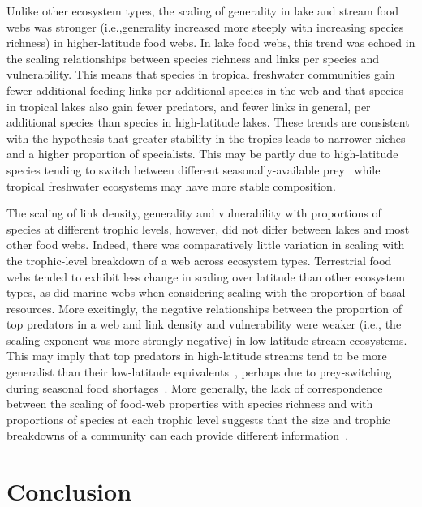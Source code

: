 \documentclass[12pt]{article}
\begin{document}
  Unlike other ecosystem types, the scaling of generality in lake and stream
  food webs was stronger (i.e.,generality increased more steeply with
  increasing species richness) in higher-latitude food webs. In lake food webs,
  this trend was echoed in the scaling relationships between species richness
  and links per species and vulnerability. This means that species in tropical
  freshwater communities gain fewer additional feeding links per additional
  species in the web and that species in tropical lakes also gain fewer
  predators, and fewer links in general, per additional species than species
  in high-latitude lakes. These trends are consistent with the hypothesis that
  greater stability in the tropics leads to narrower
  niches~\citep{Vazquez2004} and a higher proportion of specialists. This may
  be partly due to high-latitude species tending to switch between different
  seasonally-available prey~\citep{Magalhaes1993,Wilhelm1999,Isaac2012} while tropical
  freshwater ecosystems may have more stable composition.


  The scaling of link density, generality and vulnerability with proportions
  of species at different trophic levels, however, did not differ between lakes
  and most other food webs. Indeed, there was comparatively little variation in
  scaling with the trophic-level breakdown of a web across ecosystem types.
  Terrestrial food webs tended to exhibit less change in scaling over latitude
  than other ecosystem types, as did marine webs when considering scaling with
  the proportion of basal resources. More excitingly, the negative relationships
  between the proportion of top predators in a web and link density and
  vulnerability were weaker (i.e., the scaling exponent was more strongly
  negative) in low-latitude stream ecosystems. This may imply that top predators
  in high-latitude streams tend to be more generalist than their low-latitude
  equivalents~\citep{Winemiller2008}, perhaps due to prey-switching during seasonal
  food shortages~\citep{Magalhaes1993}.
  More generally, the lack of correspondence between the scaling of food-web
  properties with species richness and with proportions of species at each
  trophic level suggests that the size and trophic breakdowns of a community can
  each provide different information~\citep{Downing2002}.

\section*{Conclusion}
\end{document}

